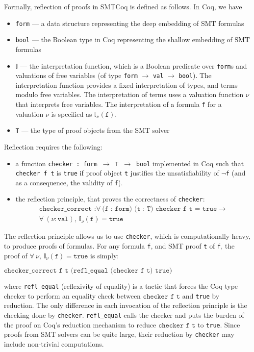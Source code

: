 \documentclass{article}
\begin{document}
	Formally, reflection of proofs 
	in SMTCoq is defined as follows. 
	In Coq, we have 
	\begin{itemize}
		\item \texttt{form} --- a data 
			structure representing the 
			deep embedding of SMT formulas
		\item \texttt{bool} --- the 
			Boolean type in Coq 
			representing the shallow 
			embedding of SMT formulas
		\item $\mathbb{I}$ --- the 
			interpretation function, which 
			is a Boolean predicate over 
			\texttt{form}s and 
			valuations of free variables 
			(of type 
			\texttt{form} $\to$ \texttt{val}
			$\to$ \texttt{bool}). The 
			interpretation function provides 
			a fixed interpretation of types, 
			and	terms modulo free variables. 
			The interpretation of terms uses 
			a valuation function $\nu$ that 
			interprets free variables. The 
			interpretation of a formula 
			\texttt{f} for a valuation $\nu$ 
			is specified as $\mathbb{I}_{\nu}
			(\texttt{f})$.
		\item \texttt{T} --- the type of 
			proof objects from the SMT 
			solver
	\end{itemize}
	Reflection requires the following:
	\begin{itemize}
		\item a function 
		\texttt{checker : form $\to$ T $\to$ 
		bool} implemented in Coq such that 
		\texttt{checker f t} is 
		\texttt{true} if proof object 
		\texttt{t} justifies the 
		unsatisfiability of \texttt{$\neg$f}
		(and as a consequence, the 
		validity of \texttt{f}).
		\item the reflection principle, that 
		proves the correctness of 
		\texttt{checker}:
		\begin{align*}
			\texttt{checker\_correct :} 
			\forall\ \texttt{(f : form)
			(t : T) checker f t = true} \to \\
			\forall\ (\nu : \texttt{val}),\ 
			\mathbb{I}_{\nu}(\texttt{f}) = 
			\texttt{true}
		\end{align*}
	\end{itemize}
	The reflection principle allows
	us to use \texttt{checker}, which 
	is computationally heavy, to 
	produce proofs of formulas. For any
	formula \texttt{f}, and SMT proof 
	\texttt{t} of \texttt{f},
	the proof of $\forall\ \nu,\ 
	\mathbb{I}_{\nu}(\texttt{f}) = 
	\texttt{true}$ is simply:
	\begin{center}
		$\texttt{checker\_correct f t
		(refl\_equal (checker f t) true)}$
	\end{center}
	where \texttt{refl\_equal} 
	(reflexivity of equality) is a tactic
	that forces the Coq type checker to 
	perform an equality check between 
	$\texttt{checker f t}$ and 
	\texttt{true} by reduction. The only 
	difference in each invocation of the 
	reflection principle is the checking 
	done by \texttt{checker}.
	\texttt{refl\_equal} calls the 
	checker and puts the burden of the 
	proof on Coq's reduction mechanism
	to reduce $\texttt{checker f t}$
	to \texttt{true}. Since proofs from 
	SMT solvers can be quite large, their
	reduction by \texttt{checker} may
	include non-trivial computations.
	
\end{document}
